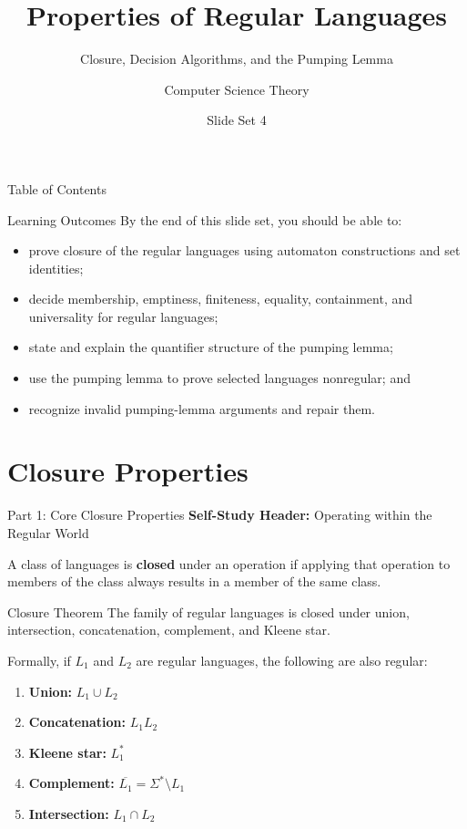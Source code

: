 \documentclass[10pt]{beamer}
\title{Properties of Regular Languages}
\subtitle{Closure, Decision Algorithms, and the Pumping Lemma}
\author{Computer Science Theory}
\date{Slide Set 4}
\begin{document}
\begin{frame}
  \titlepage
\end{frame}

\begin{frame}{Table of Contents}
  \tableofcontents
\end{frame}

\begin{frame}{Learning Outcomes}
  By the end of this slide set, you should be able to:
  \begin{itemize}
    \item prove closure of the regular languages using automaton
      constructions and set identities;
    \item decide membership, emptiness, finiteness, equality, containment, and
      universality for regular languages;
    \item state and explain the quantifier structure of the pumping lemma;
    \item use the pumping lemma to prove selected languages nonregular; and
    \item recognize invalid pumping-lemma arguments and repair them.
  \end{itemize}
\end{frame}

\section{Closure Properties}

\begin{frame}{Part 1: Core Closure Properties}
  \textbf{Self-Study Header:} Operating within the Regular World
  \vspace{0.2cm}
  
  A class of languages is \textbf{closed} under an operation if applying that operation to members of the class always results in a member of the same class.
  \pause
  
  \begin{block}{Closure Theorem}
    The family of regular languages is closed under union, intersection,
    concatenation, complement, and Kleene star.
  \end{block}
  \pause
  
  Formally, if $L_1$ and $L_2$ are regular languages, the following are also regular:
  \begin{enumerate}
      \item \textbf{Union:} $L_1 \cup L_2$
      \item \textbf{Concatenation:} $L_1 L_2$
      \item \textbf{Kleene star:} $L_1^*$
      \item \textbf{Complement:} $\overline{L_1} = \Sigma^* \setminus L_1$
      \item \textbf{Intersection:} $L_1 \cap L_2$
  \end{enumerate}
\end{frame}
\end{document}
